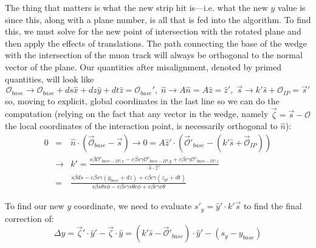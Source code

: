 The thing that matters is what the new strip hit is---i.e. what the new $y$ value is since this, along with a plane number, is all that is fed into the algorithm.  To find this, we must solve for the new point of intersection with the rotated plane and then apply the effects of translations.  The path connecting the base of the wedge with the intersection of the muon track will always be orthogonal to the normal vector of the plane.  Our quantities after misalignment, denoted by primed quantities, will look like
\begin{equation}
\mathscr{O}_{base}\to\mathscr{O}_{base}+ ds\hat{x}+dz\hat{y}+dt\hat{z}=\mathscr{O}_{base}',\;\hat{n}\to A\hat{n}=A\hat{z}=\hat{z}',\;\vec{s}\to k'\hat{s}+\mathscr{O}_{IP}=\vec{s}'
\end{equation}
so, moving to explicit, global coordinates in the last line so we can do the computation (relying on the fact that any vector in the wedge, namely $\vec{\zeta}=\vec{s}-\mathscr{O}$ the local coordinates of the interaction point, is necessarily orthogonal to $\hat{n}$):
\begin{eqnarray}
0&=&\hat{n}\cdot\left(\vec{\mathscr{O}}_{base}-\vec{s}\right)\to 0=A\hat{z}'\cdot\left(\vec{\mathscr{O}}'_{base}-\left(k'\hat{s}+\vec{\mathscr{O}}_{IP}\right)\right)\\
 &\to& k'=\frac{s\beta \mathscr{O}'_{base-IP,x}-c\beta s\gamma \mathscr{O}'_{base-IP,y}+c\beta c\gamma \mathscr{O}'_{base-IP,z}}{\hat{s}\cdot\hat{z}'}\\
&=&\frac{s\beta ds-c\beta s\gamma \left(y_{base}+dz\right)+c\beta c\gamma \left(z_{pl}+dt\right)}{s\beta s\theta s\phi-c\beta s\gamma s\theta c\phi+c\beta c\gamma c\theta}
\end{eqnarray}

To find our new $y$ coordinate, we need to evaluate $s'_y=\hat{y}'\cdot k'\vec{s}$ to find the final correction of:
\begin{equation}
\label{eqn:finaldymis}
\Delta y=\vec{\zeta}'\cdot\hat{y}'-\vec{\zeta}\cdot\hat{y}=\left(k'\hat{s}-\vec{\mathscr{O}}'_{base}\right)\cdot\hat{y}'-\left(s_y-y_{base}\right)
\end{equation}

